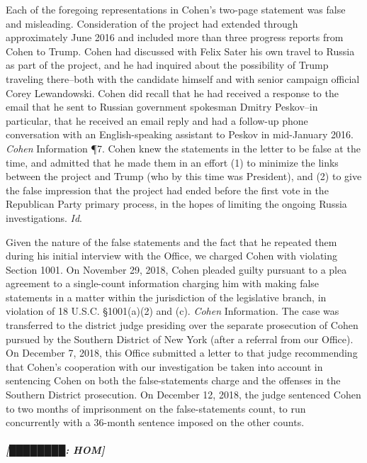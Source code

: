 Each of the foregoing representations in Cohen's two-page statement was false and misleading. 
Consideration of the project had extended through approximately June 2016 and included more than three progress reports from Cohen to Trump. 
Cohen had discussed with Felix Sater his own travel to Russia as part of the project, and he had inquired about the possibility of Trump traveling there--both with the candidate himself and with senior campaign official Corey Lewandowski. 
Cohen did recall that he had received a response to the email that he sent to Russian government spokesman Dmitry Peskov--in particular, that he received an email reply and had a follow-up phone conversation with an English-speaking assistant to Peskov in mid-January 2016. 
\textit{Cohen} Information \P 7. 
Cohen knew the statements in the letter to be false at the time, and admitted that he made them in an effort (1) to minimize the links between the project and Trump (who by this time was President), and (2) to give the false impression that the project had ended before the first vote in the Republican Party primary process, in the hopes of limiting the ongoing Russia investigations. 
\textit{Id}.

Given the nature of the false statements and the fact that he repeated them during his initial interview with the Office, we charged Cohen with violating Section 1001. 
On November 29, 2018, Cohen pleaded guilty pursuant to a plea agreement to a single-count information charging him with making false statements in a matter within the jurisdiction of the legislative branch, in violation of 18 U.S.C. \S 1001(a)(2) and (c). 
\textit{Cohen} Information. 
The case was transferred to the district judge presiding over the separate prosecution of Cohen pursued by the Southern District of New York (after a referral from our Office). 
On December 7, 2018, this Office submitted a letter to that judge recommending that Cohen's cooperation with our investigation be taken into account in sentencing Cohen on both the false-statements charge and the offenses in the Southern District prosecution. 
On December 12, 2018, the judge sentenced Cohen to two months of imprisonment on the false-statements count, to run concurrently with a 36-month sentence imposed on the other counts.

\subparagraph{[████████: HOM]}



